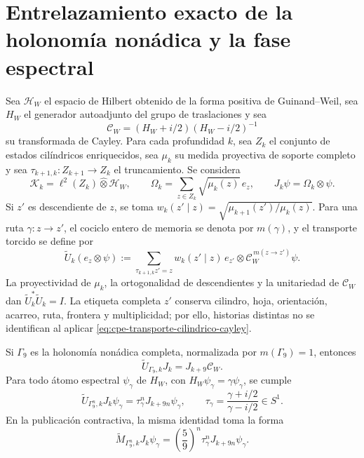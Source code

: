 
\section{Entrelazamiento exacto de la holonomía nonádica y la fase espectral}
\label{sec:cpe-entrelazamiento-exacto}

Sea \(\mathcal H_W\) el espacio de Hilbert obtenido de la forma positiva de
Guinand--Weil, sea \(H_W\) el generador autoadjunto del grupo de
traslaciones y sea
\[
 \mathcal C_W=(H_W+i/2)(H_W-i/2)^{-1}
\]
su transformada de Cayley. Para cada profundidad \(k\), sea \(Z_k\) el
conjunto de estados cilíndricos enriquecidos, sea \(\mu_k\) su medida
proyectiva de soporte completo y sea
\(\tau_{k+1,k}:Z_{k+1}\to Z_k\) el truncamiento. Se considera
\[
 \mathscr K_k=\ell^2(Z_k)\widehat\otimes\mathcal H_W,
 \qquad
 \Omega_k=\sum_{z\in Z_k}\sqrt{\mu_k(z)}\,e_z,
 \qquad
 J_k\psi=\Omega_k\otimes\psi.
\]
Si \(z'\) es descendiente de \(z\), se toma
\(w_k(z'\mid z)=\sqrt{\mu_{k+1}(z')/\mu_k(z)}\). Para una ruta
\(\gamma:z\to z'\), el cociclo entero de memoria se denota por
\(m(\gamma)\), y el transporte torcido se define por
\begin{equation}
 \widetilde U_k(e_z\otimes\psi)
 :=\sum_{\tau_{k+1,k}z'=z}
 w_k(z'\mid z)\,e_{z'}\otimes
 \mathcal C_W^{\,m(z\to z')}\psi.
 \label{eq:cpe-transporte-cilindrico-cayley}
\end{equation}
La proyectividad de \(\mu_k\), la ortogonalidad de descendientes y la
unitariedad de \(\mathcal C_W\) dan
\(\widetilde U_k^*\widetilde U_k=I\). La etiqueta completa \(z'\)
conserva cilindro, hoja, orientación, acarreo, ruta, frontera y
multiplicidad; por ello, historias distintas no se identifican al aplicar
\eqref{eq:cpe-transporte-cilindrico-cayley}.

\begin{theorem}
\label{thm:cpe-entrelazamiento-cayley-tpk}
Si \(\Gamma_9\) es la holonomía nonádica completa, normalizada por
\(m(\Gamma_9)=1\), entonces
\begin{equation}
 \boxed{\widetilde U_{\Gamma_9,k}J_k
 =J_{k+9}\mathcal C_W.}
 \label{eq:cpe-entrelazamiento-exacto}
\end{equation}
Para todo átomo espectral \(\psi_\gamma\) de \(H_W\), con
\(H_W\psi_\gamma=\gamma\psi_\gamma\), se cumple
\begin{equation}
 \widetilde U_{\Gamma_9^n,k}J_k\psi_\gamma
 =\tau_\gamma^nJ_{k+9n}\psi_\gamma,
 \qquad
 \tau_\gamma=\frac{\gamma+i/2}{\gamma-i/2}\in S^1.
 \label{eq:cpe-orbita-espectral-ledger}
\end{equation}
En la publicación contractiva, la misma identidad toma la forma
\[
 \widetilde M_{\Gamma_9^n,k}J_k\psi_\gamma
 =\left(\frac59\right)^n\tau_\gamma^n
 J_{k+9n}\psi_\gamma.
\]
\end{theorem}

